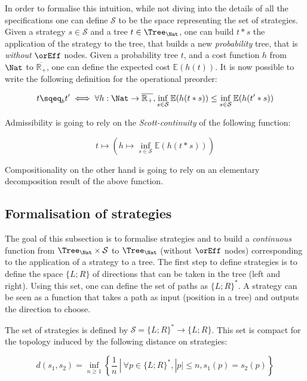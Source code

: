 In order to formalise this intuition, while not diving into the details of 
all the specifications one can 
define $\mathcal{S}$ to be the space representing 
the set of strategies. Given a strategy $s \in \mathcal{S}$ and 
a tree $t \in \Tree_\Nat$, one can build $t*s$ the application of 
the strategy to the tree, that builds a new \emph{probability} tree, that 
is \emph{without} $\orEff$ nodes. Given a probability tree $t$, and a 
cost function $h$ from $\Nat$ to $\overline{\mathbb{R}_+}$, one can define the expected cost $\mathbb{E} (h(t))$.
It is now possible to write the following definition for the operational 
preorder:

\begin{equation*}
    t \sqeq_b t' \iff 
    \forall h : \Nat \to \overline{\mathbb{R}_+}, 
    \inf_{s \in \mathcal{S}} \mathbb{E}(h(t*s)) \leq 
    \inf_{s \in \mathcal{S}} \mathbb{E}(h(t'*s))
\end{equation*}

Admissibility is going to rely on the \emph{Scott-continuity} 
of the following function:

\begin{equation*}
    t \mapsto \left(h \mapsto \inf_{s \in \mathcal{S}} \mathbb{E} (h
(t*s))\right)
\end{equation*}

Compositionality on the other hand is going to rely on an elementary 
decomposition result of the above function.

\subsection{Formalisation of strategies} 

The goal of this subsection is to formalise strategies and 
to build a \emph{continuous} function from $\Tree_\Nat \times \mathcal{S}$
to $\Tree_\Nat$ (without $\orEff$ nodes) corresponding to the 
application of a strategy to a tree.
The first step to define strategies is to define the space 
$\{ L; R\}$ of directions that can be taken in the tree (left and right).
Using this set, one can define the set of paths as $\{ L; R \}^*$. A 
strategy can be seen as a function that takes a path as input (position 
in a tree) and outputs the direction to choose.

\begin{adefinition}[Strategies]
     The set of strategies is 
     defined by $\mathcal{S} = \{ L;R\}^* \to \{ L; R\}$.
     This set is compact for the topology induced by the 
     following distance on strategies:

     \begin{equation*}
         d(s_1,s_2) = \inf_{n \geq 1} \left\{ \frac{1}{n} ~|~ \forall p \in \{ L;R\}^*,
                                         |p| \leq n, s_1(p) = s_2(p) \right\}
     \end{equation*}
\end{adefinition}

